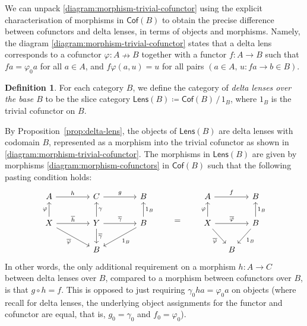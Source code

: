 \documentclass[colorlinks = true, a4paper, oneside, reqno, 11pt]{amsart}
\theoremstyle{definition}
\newtheorem{definition}[theorem]{Definition}
\theoremstyle{remark}
\newcommand{\Cof}{\mathsf{Cof}}
\newcommand{\Lens}{\mathsf{Lens}}
\newcommand{\phibar}{\overline{\varphi}}
\begin{document}
We can unpack \eqref{diagram:morphism-trivial-cofunctor} using the explicit 
characterisation of morphisms in $\Cof(B)$ to obtain the precise difference 
between cofunctors and delta lenses, in terms of objects and morphisms. 
Namely, the diagram \eqref{diagram:morphism-trivial-cofunctor} states that a delta 
lens corresponds to a cofunctor $\varphi \colon A \nrightarrow B$ together with 
a functor $f \colon A \rightarrow B$ such that $fa = \varphi_{0}a$ for all $a \in A$,
and $f\varphi(a, u) = u$ for all pairs $(a \in A, \, u \colon fa \rightarrow b \in B)$.

\begin{definition}
\label{defn:delta-lens-category}
For each category $B$, we define the category of \emph{delta lenses over the base $B$} to be the
slice category $\Lens(B) \coloneqq \Cof(B) \, / \, 1_{B}$, 
where $1_{B}$ is the trivial cofunctor on $B$. 
\end{definition}

By Proposition~\ref{prop:delta-lens}, the objects of $\Lens(B)$ are delta lenses with codomain 
$B$, represented as a morphism into the trivial cofunctor as shown in 
\eqref{diagram:morphism-trivial-cofunctor}. 
The morphisms in $\Lens(B)$ are given by morphisms \eqref{diagram:morphism-cofunctors} 
in $\Cof(B)$ such that the following pasting condition holds: 
\begin{equation}\label{diagram:morphism-delta-lens}
\begin{tikzcd}[column sep = 2em]
A 
\arrow[rr, "h"]
& & C
\arrow[rr, "g"]
& & B
\\
X
\arrow[u, "\varphi"]
\arrow[rr, "\overline{h}"]
\arrow[rrd, "\phibar"']
& & Y 
\arrow[u, "\gamma"']
\arrow[d, "\overline{\gamma}"]
\arrow[rr, "\overline{\gamma}"]
& & B
\arrow[u, "1_{B}"']
\arrow[lld, "1_{B}"]
\\
& & B & & 
\end{tikzcd}
%
\qquad = \qquad
% 
\begin{tikzcd}[column sep = small]
A 
\arrow[rr, "f"]
& & B
\\
X
\arrow[u, "\varphi"]
\arrow[rr, "\phibar"]
\arrow[rd, "\phibar"'] 
& & B 
\arrow[u, "1_{B}"']
\arrow[ld, "1_{B}"]
\\
& B &
\end{tikzcd}
\end{equation}
In other words, the only additional requirement on a morphism $h \colon A \rightarrow C$ 
between delta lenses over $B$, compared to a morphism between cofunctors over $B$, 
is that $g \circ h = f$. 
This is opposed to just requiring $\gamma_{0}ha = \varphi_{0}a$
on objects (where recall for delta lenses, the underlying object assignments for the 
functor and cofunctor are equal, that is, 
$g_{0} = \gamma_{0}$ and $f_{0} = \varphi_{0}$). 
\end{document}
